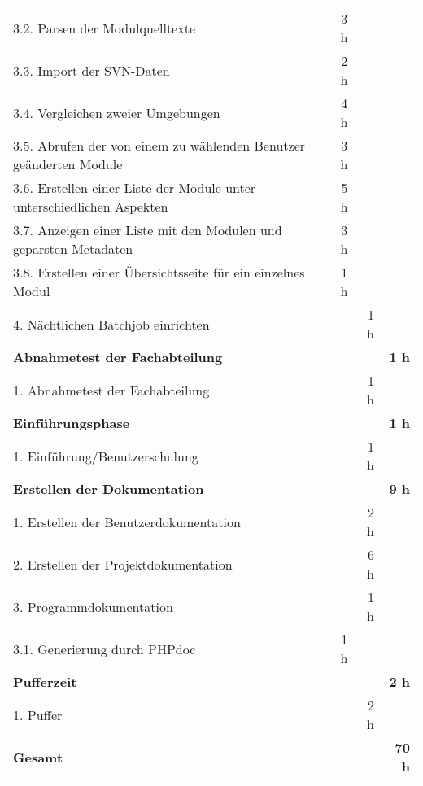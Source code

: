 \begin{tabularx}{\textwidth}{Xrrr}
3.2. Parsen der Modulquelltexte & 3 h   &       &  \\
3.3. Import der SVN-Daten & 2 h   &       &  \\
3.4. Vergleichen zweier Umgebungen & 4 h   &       &  \\
3.5. Abrufen der von einem zu wählenden Benutzer geänderten Module & 3 h   &       &  \\
3.6. Erstellen einer Liste der Module unter unterschiedlichen Aspekten & 5 h   &       &  \\
3.7. Anzeigen einer Liste mit den Modulen und geparsten Metadaten & 3 h   &       &  \\
3.8. Erstellen einer Übersichtsseite für ein einzelnes Modul & 1 h   &       &  \\
4. Nächtlichen Batchjob einrichten &       & 1 h   &  \\
\rowcolor{cTableHeading}\bf{Abnahmetest der Fachabteilung} & \bf{} & \bf{} & \bf{1 h} \\
1. Abnahmetest der Fachabteilung &       & 1 h   &  \\
\rowcolor{cTableHeading}\bf{Einführungsphase} & \bf{} & \bf{} & \bf{1 h} \\
1. Einführung/Benutzerschulung &       & 1 h   &  \\
\rowcolor{cTableHeading}\bf{Erstellen der Dokumentation} & \bf{} & \bf{} & \bf{9 h} \\
1. Erstellen der Benutzerdokumentation &       & 2 h   &  \\
2. Erstellen der Projektdokumentation &       & 6 h   &  \\
3. Programmdokumentation &       & 1 h   &  \\
3.1. Generierung durch PHPdoc & 1 h   &       &  \\
\rowcolor{cTableHeading}\bf{Pufferzeit} & \bf{} & \bf{} & \bf{2 h} \\
1. Puffer &       & 2 h   &  \\
\hline
\hline
\rowcolor{cTableHeading}\bf{Gesamt} & \bf{} & \bf{} & \bf{70 h} \\
\end{tabularx}

